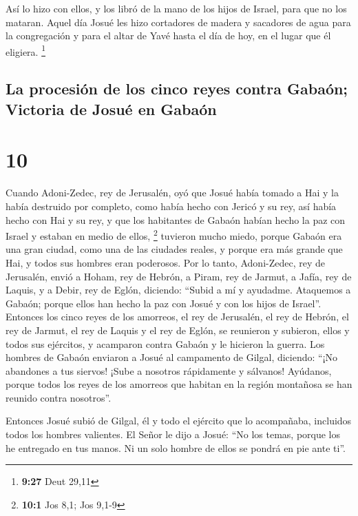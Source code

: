  Así lo hizo con ellos, y los libró de la mano de los
hijos de Israel, para que no los mataran.  Aquel día
Josué les hizo cortadores de madera y sacadores de agua para la
congregación y para el altar de Yavé hasta el día de hoy, en el lugar
que él eligiera. \footnote{\textbf{9:27} Deut 29,11}

\hypertarget{la-procesiuxf3n-de-los-cinco-reyes-contra-gabauxf3n-victoria-de-josuuxe9-en-gabauxf3n}{%
\subsection{La procesión de los cinco reyes contra Gabaón; Victoria de
Josué en
Gabaón}\label{la-procesiuxf3n-de-los-cinco-reyes-contra-gabauxf3n-victoria-de-josuuxe9-en-gabauxf3n}}

\hypertarget{section-9}{%
\section{10}\label{section-9}}

 Cuando Adoni-Zedec, rey de Jerusalén, oyó que Josué había
tomado a Hai y la había destruido por completo, como había hecho con
Jericó y su rey, así había hecho con Hai y su rey, y que los habitantes
de Gabaón habían hecho la paz con Israel y estaban en medio de ellos,
\footnote{\textbf{10:1} Jos 8,1; Jos 9,1-9}  tuvieron
mucho miedo, porque Gabaón era una gran ciudad, como una de las ciudades
reales, y porque era más grande que Hai, y todos sus hombres eran
poderosos.  Por lo tanto, Adoni-Zedec, rey de Jerusalén,
envió a Hoham, rey de Hebrón, a Piram, rey de Jarmut, a Jafía, rey de
Laquis, y a Debir, rey de Eglón, diciendo:  ``Subid a mí y
ayudadme. Ataquemos a Gabaón; porque ellos han hecho la paz con Josué y
con los hijos de Israel''.  Entonces los cinco reyes de
los amorreos, el rey de Jerusalén, el rey de Hebrón, el rey de Jarmut,
el rey de Laquis y el rey de Eglón, se reunieron y subieron, ellos y
todos sus ejércitos, y acamparon contra Gabaón y le hicieron la guerra.
 Los hombres de Gabaón enviaron a Josué al campamento de
Gilgal, diciendo: ``¡No abandones a tus siervos! ¡Sube a nosotros
rápidamente y sálvanos! Ayúdanos, porque todos los reyes de los amorreos
que habitan en la región montañosa se han reunido contra nosotros''.

 Entonces Josué subió de Gilgal, él y todo el ejército que
lo acompañaba, incluidos todos los hombres valientes.  El
Señor le dijo a Josué: ``No los temas, porque los he entregado en tus
manos. Ni un solo hombre de ellos se pondrá en pie ante ti''.

